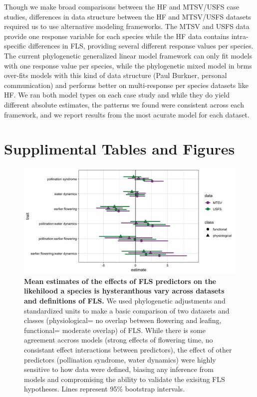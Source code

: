 \documentclass[12pt]{article}\usepackage[]{graphicx}\usepackage[]{color}
\begin{document}
\indent Though we make broad comparisons between the HF and MTSV/USFS case studies, differences in data structure between the HF  and MTSV/USFS datasets required us to use alternative modeling frameworks. The MTSV and USFS data provide one response variable for each species while the HF data contains intra-specific differences in FLS, providing several different response values per species. The current phylogenetic generalized linear model framework can only fit models with one response value per species, while the phylogenetic mixed model in brms over-fits models with this kind of data structure (Paul Burkner, personal communication) and performs better on multi-response per species datasets like HF. We ran both model types on each case study and while they do yield different absolute estimates, the patterns we found were consistent across each framework, and we report results from the most acurate model for each dataset.\\
\section*{Supplimental Tables and Figures}

\begin{figure}[h!]
    \centering
 \includegraphics[width=\textwidth]{..//MTSV_USFS.jpeg} 
    \caption{\textbf{Mean estimates of the effects of FLS predictors on the likehilood a species is hysteranthous vary across datasets and definitions of FLS.}  We used phylogenetic adjustments and standardized units to make a basic comparison of two datasets and classes (physiological= no overlap between flowering and leafing, functional= moderate overlap) of FLS. While there is some agreement accross models (strong effects of flowering time, no consistant effect interactions between predictors), the effect of other predictors (pollination syndrome, water dynamics) were highly sensitive to how data were defined, biasing any inference from models and compromising the ability to validate the exisitng FLS hypotheses. Lines represent 95\% bootstrap intervals.}
    \label{fig: muplots.USMT}
\end{figure}
\end{document}

